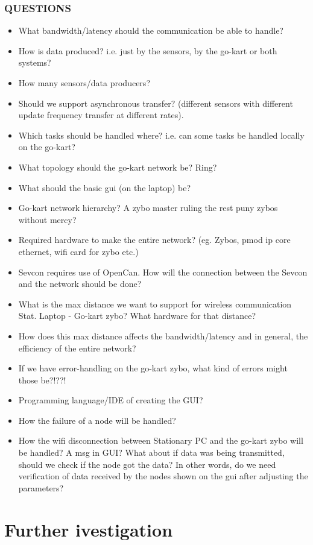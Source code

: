 \subsubsection{QUESTIONS}
\begin{itemize}{}
\item What bandwidth/latency should the communication be able to handle?
\item How is data produced? i.e. just by the sensors, by the go-kart or both systems?
\item How many sensors/data producers?\\
\item Should we support asynchronous transfer? (different sensors with different 
update frequency transfer at different rates).\\
\item Which tasks should be handled where? i.e. can some tasks be handled locally on 
the go-kart?
\item What topology should the go-kart network be? Ring?
\item What should the basic gui (on the laptop) be?
\item Go-kart network hierarchy? A zybo master ruling the rest puny zybos without mercy?
\item Required hardware to make the entire network? (eg. Zybos, pmod ip core ethernet, wifi card for zybo etc.)
\item Sevcon requires use of OpenCan. How will the connection between the Sevcon and the network should be done?
\item What is the max distance we want to support for wireless communication Stat. Laptop - Go-kart zybo? What hardware for that distance?
\item How does this max distance affects the bandwidth/latency and in general, the efficiency of the entire network?
\item If we have error-handling on the go-kart zybo, what kind of errors might those be?!??!
\item Programming language/IDE of creating the GUI?
\item How the failure of a node will be handled?
\item How the wifi disconnection between Stationary PC and the go-kart zybo will be handled? A msg in GUI? What about if data was being transmitted, should we check if the node got the data? In other words, do we need verification of data received by the nodes shown on the gui after adjusting the parameters?

\end{itemize}


\section{Further ivestigation}
